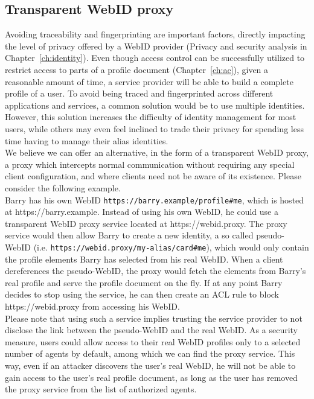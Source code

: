 \subsection{Transparent WebID proxy}
\label{subsec:webid_proxy}
Avoiding traceability and fingerprinting are important factors, directly impacting the level of privacy offered by a WebID provider (Privacy and security analysis in Chapter~\ref{ch:identity}). Even though access control can be successfully utilized to restrict access to parts of a profile document (Chapter~\ref{ch:ac}), given a reasonable amount of time, a service provider will be able to build a complete profile of a user. To avoid being traced and fingerprinted across different applications and services, a common solution would be to use multiple identities. However, this solution increases the difficulty of identity management for most users, while others may even feel inclined to trade their privacy for spending less time having to manage their alias identities.\\

We believe we can offer an alternative, in the form of a transparent WebID proxy, a proxy which intercepts normal communication without requiring any special client configuration, and where clients need not be aware of its existence. Please consider the following example.\\

Barry has his own WebID \verb+https://barry.example/profile#me+, which is hosted at https://barry.example. Instead of using his own WebID, he could use a transparent WebID proxy service located at https://webid.proxy. The proxy service would then allow Barry to create a new identity, a so called pseudo-WebID (i.e. \verb+https://webid.proxy/my-alias/card#me+), which would only contain the profile elements Barry has selected from his real WebID. When a client dereferences the pseudo-WebID, the proxy would fetch the elements from Barry's real profile and serve the profile document on the fly. If at any point Barry decides to stop using the service, he can then create an ACL rule to block https://webid.proxy from accessing his WebID.\\

Please note that using such a service implies trusting the service provider to not disclose the link between the pseudo-WebID and the real WebID. As a security measure, users could allow access to their real WebID profiles only to a selected number of agents by default, among which we can find the proxy service. This way, even if an attacker discovers the user's real WebID, he will not be able to gain access to the user's real profile document, as long as the user has removed the proxy service from the list of authorized agents.







